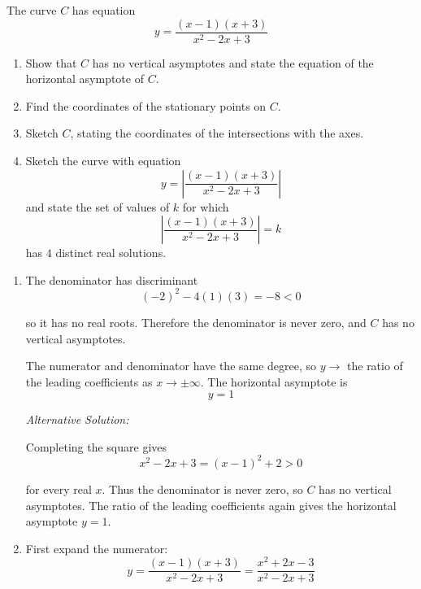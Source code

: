 \documentclass[leqno]{article}
\begin{document}
\begin{enumerate}[
  label=\textbf{\arabic*.},
  leftmargin=*,
  topsep=0pt,
  partopsep=0pt,
  parsep=0pt
]
\newpage

\questionitem

The curve $C$ has equation
\[
y=\frac{(x-1)(x+3)}{x^2-2x+3}
\]
\begin{enumerate}[label=\textbf{(\alph*)}]
  \item Show that $C$ has no vertical asymptotes and state the equation of the horizontal asymptote of $C$.  \\
  \item Find the coordinates of the stationary points on $C$.  \\
  \item Sketch $C$, stating the coordinates of the intersections with the axes.  \\
  \item Sketch the curve with equation
  \[
  y=\left|\frac{(x-1)(x+3)}{x^2-2x+3}\right|
  \]
  and state the set of values of $k$ for which
  \[
  \left|\frac{(x-1)(x+3)}{x^2-2x+3}\right|=k
  \]
  has $4$ distinct real solutions.  \\
\end{enumerate}

\vspace*{10pt}

\begin{djsSolution}
\begin{enumerate}[label=\textbf{(\alph*)}]
  \item The denominator has discriminant
  \[
  (-2)^2-4(1)(3)=-8<0
  \]

  so it has no real roots. Therefore the denominator is never zero, and $C$ has no vertical asymptotes.

  The numerator and denominator have the same degree, so \(y\to\) the ratio of the leading coefficients as \(x\to\pm\infty\). The horizontal asymptote is
  \[
  y=1
  \]

{\setlength{\parskip}{8pt}%
\textit{Alternative Solution:}

Completing the square gives
\[
x^2-2x+3=(x-1)^2+2>0
\]

for every real \(x\). Thus the denominator is never zero, so \(C\) has no vertical asymptotes. The ratio of the leading coefficients again gives the horizontal asymptote \(y=1\).
\par}

  \item First expand the numerator:
  \[
  y=\frac{(x-1)(x+3)}{x^2-2x+3}=\frac{x^2+2x-3}{x^2-2x+3}
  \]


\end{enumerate}
\end{djsSolution}
\end{enumerate}
\end{document}

